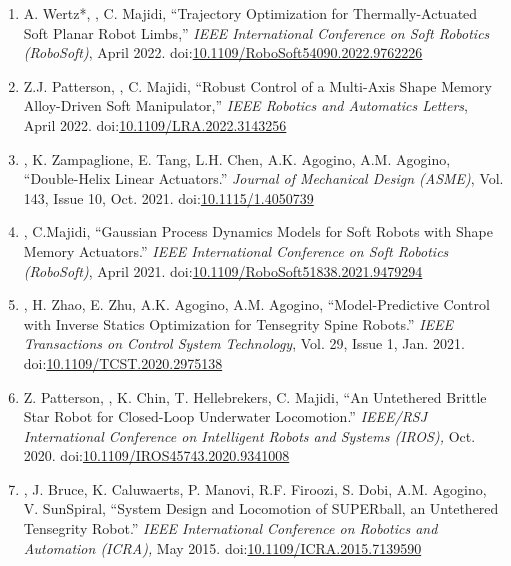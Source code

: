 \documentclass[letterpaper]{deedy-resume} %
\newcommand\doilink[1]{\href{http://dx.doi.org/#1}{#1}}
\newcommand\doi[1]{doi:\doilink{#1}}
\begin{document}
{\begin{enumerate}
\item A. Wertz*, \underline{{}}, C. Majidi, ``Trajectory Optimization for Thermally-Actuated Soft Planar Robot Limbs,'' {\it IEEE International Conference on Soft Robotics (RoboSoft)}, April 2022. \doi{10.1109/RoboSoft54090.2022.9762226}

\item Z.J. Patterson, \underline{{}}, C. Majidi, ``Robust Control of a Multi-Axis Shape Memory Alloy-Driven Soft Manipulator,'' {\it IEEE Robotics and Automatics Letters}, April 2022. \doi{10.1109/LRA.2022.3143256}

\item \underline{{}}, K. Zampaglione, E. Tang, L.H. Chen, A.K. Agogino, A.M. Agogino, ``Double-Helix Linear Actuators.'' {\it Journal of Mechanical Design (ASME)}, Vol. 143, Issue 10, Oct. 2021. \doi{10.1115/1.4050739}

\item \underline{{}}, C.Majidi, ``Gaussian Process Dynamics Models for Soft Robots with Shape Memory Actuators.'' {\it IEEE International Conference on Soft Robotics (RoboSoft)}, April 2021.  \doi{10.1109/RoboSoft51838.2021.9479294}

\item \underline{{}}, H. Zhao, E. Zhu, A.K. Agogino, A.M. Agogino, ``Model-Predictive Control with Inverse Statics Optimization for Tensegrity Spine Robots.'' {\it IEEE Transactions on Control System Technology}, Vol. 29, Issue 1, Jan. 2021. \doi{10.1109/TCST.2020.2975138}

\item Z. Patterson, \underline{{}}, K. Chin, T. Hellebrekers, C. Majidi, ``An Untethered Brittle Star Robot for Closed-Loop Underwater Locomotion.'' {\it IEEE/RSJ International Conference on Intelligent Robots and Systems (IROS),} Oct. 2020. \doi{10.1109/IROS45743.2020.9341008}

\item \underline{{}}, J. Bruce, K. Caluwaerts, P. Manovi, R.F. Firoozi, S. Dobi, A.M. Agogino, V. SunSpiral, ``System Design and Locomotion of SUPERball, an Untethered Tensegrity Robot.'' {\it IEEE International Conference on Robotics and Automation (ICRA),} May 2015. \doi{10.1109/ICRA.2015.7139590}
\end{enumerate}

}
\end{document}

